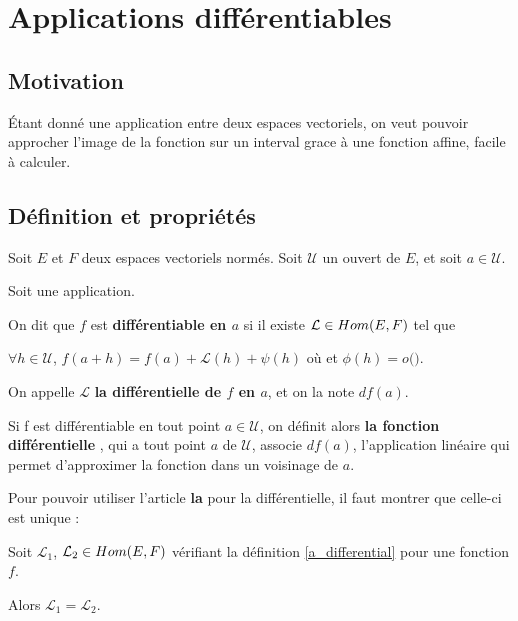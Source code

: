 \chapter{Applications différentiables}
\label{chapter_differential}
\section{Motivation}
	Étant donné une application entre deux espaces vectoriels, on veut pouvoir
	approcher l'image de la fonction sur un interval grace à une fonction
	affine, facile à calculer.


\section{Définition et propriétés}

\begin{definition} 
	Soit $E$ et $F$ deux espaces vectoriels normés.
	Soit $\mathcal{U}$ un ouvert de $E$, et soit $a \in \mathcal{U}$.

	Soit  une application.

	On dit que $f$ est \textbf{différentiable en $a$} si il existe $\mathcal{L}
	\in Hom(E, F)$ tel que
	
	$\forall h \in \mathcal{U}$,
	$f(a + h) = f(a) + \mathcal{L}(h) + \psi(h)$ où
	et $\phi(h) = o($$)$.

	\label{a_differential}
\end{definition}

On appelle $\mathcal{L}$ \textbf{la différentielle de $f$ en $a$}, et on la note
$df(a)$.

Si f est différentiable en tout point $a \in \mathcal{U}$, on définit alors
\textbf{la fonction différentielle}
, qui a tout point $a$
de $\mathcal{U}$, associe $df(a)$, l'application linéaire qui permet
d'approximer la fonction dans un voisinage de $a$.

Pour pouvoir utiliser l'article \textbf{la} pour la différentielle, il faut
montrer que celle-ci est unique :

\begin{proposition}
	Soit $\mathcal{L}_{1}$, $\mathcal{L}_{2} \in Hom(E, F)$
	vérifiant la définition \ref{a_differential} pour une fonction $f$.

	Alors $\mathcal{L}_{1} = \mathcal{L}_{2}$.
\end{proposition}

